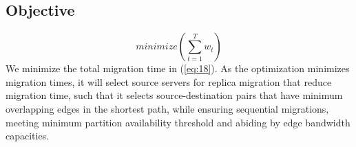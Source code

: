 \subsection{Objective}
\vspace{-5mm}
\begin{equation}
minimize\left(\sum_{t=1}^Tw_t\right)
\label{eq:18}
\end{equation}
We minimize the total migration time in (\ref{eq:18}). As the optimization minimizes migration times, it will select source servers for replica migration that reduce migration time, such that it selects source-destination pairs that have minimum overlapping edges in the shortest path, while ensuring sequential migrations, meeting minimum partition availability threshold and abiding by edge bandwidth capacities.
